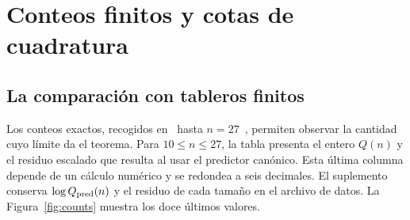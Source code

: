 \section{Conteos finitos y cotas de cuadratura}\label{app:numquad}
\subsection{La comparación con tableros finitos}\label{sec:ajuste-finito}
Los conteos exactos, recogidos en~\cite{oeis} hasta $n=27$~\cite{q27}, permiten observar la
cantidad cuyo límite da el teorema. Para
$10\le n\le27$, la tabla presenta el entero $Q(n)$ y el residuo escalado que resulta al usar el
predictor canónico. Esta última columna depende de un cálculo numérico y se redondea a seis
decimales. El suplemento conserva $\log Q_{\rm pred}(n)$ y el residuo de cada tamaño en el
archivo de datos. La Figura~\ref{fig:counts} muestra los doce últimos valores.

